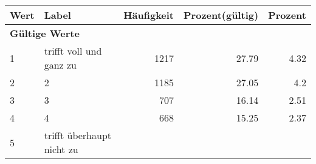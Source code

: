      \begin{longtable}{lXrrr}
     \toprule
     \textbf{Wert} & \textbf{Label} & \textbf{Häufigkeit} & \textbf{Prozent(gültig)} & \textbf{Prozent} \\
     \endhead
     \midrule
     \multicolumn{5}{l}{\textbf{Gültige Werte}}\\

     1 &
     \multicolumn{1}{X}{ trifft voll und ganz zu   } &


       \num{1217} &
       \num[round-mode=places,round-precision=2]{27,79} &
         \num[round-mode=places,round-precision=2]{4,32} \\

     2 &
     \multicolumn{1}{X}{ 2   } &


       \num{1185} &
       \num[round-mode=places,round-precision=2]{27,05} &
         \num[round-mode=places,round-precision=2]{4,2} \\

     3 &
     \multicolumn{1}{X}{ 3   } &


       \num{707} &
       \num[round-mode=places,round-precision=2]{16,14} &
         \num[round-mode=places,round-precision=2]{2,51} \\

     4 &
     \multicolumn{1}{X}{ 4   } &


       \num{668} &
       \num[round-mode=places,round-precision=2]{15,25} &
         \num[round-mode=places,round-precision=2]{2,37} \\

     5 &
     \multicolumn{1}{X}{ trifft überhaupt nicht zu   } &



\end{longtable}
